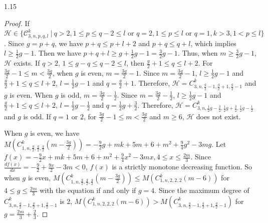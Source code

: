 \documentclass[preprint,12pt]{elsarticle1}
\numberwithin{equation}{section}
\begin{document}
\begin{spacing}{1.15}
\begin{proof}
If $\mathcal{H} \in \{\mathcal{C}_{3,n,p,q,l}^{k}~|~ q>2, 1\leq p\leq q-2\leq l\text{~or~} q=2,1\leq p\leq l  \text {~or~}q=1, k>3,1<p\leq l\}$.
Since $g=p+q$,
we have $p+q\leq p+l+2$ and $p+q\leq q+l$,
which implies $l\geq \frac{1}{2}g-1$.
Then we have $p+q+l\geq g+\frac{1}{2}g-1=\frac{3}{2}g-1$.
Thus,
when $m\geq \frac{3}{2}g-1$, $\mathcal{H}$ exists.
If $q>2$, $1\leq g-q\leq q-2\leq l$, then $\frac{g}{2}+1\leq q \leq l+2.$
For $\frac{3g}{2}-1\leq m<\frac{3g}{2}$, when $g$ is even, $m=\frac{3g}{2}-1$.
Since $m=\frac{3g}{2}-1$, $l\geq \frac{1}{2}g-1$ and $\frac{g}{2}+1\leq q \leq l+2$, $l=\frac{1}{2}g-1$ and $q=\frac{g}{2}+1$.
Therefore, $\mathcal{H}=C_{3,n,\frac{g}{2}-1,\frac{g}{2}+1,\frac{g}{2}-1}^{k}$ and $g$ is even.
When $g$ is odd, $m=\frac{3g}{2}-\frac{1}{2}$. Since $m=\frac{3g}{2}-\frac{1}{2}$, $l\geq \frac{1}{2}g-1$ and $\frac{g}{2}+1\leq q \leq l+2$, $l=\frac{1}{2}g-\frac{1}{2}$ and $q=\frac{1}{2}g+\frac{3}{2}$. Therefore, $\mathcal{H}=C_{3,n,\frac{1}{2}g-\frac{3}{2},\frac{1}{2}g+\frac{3}{2},\frac{1}{2}g-\frac{1}{2}}^{k}$ and $g$ is odd.
If $q=1$ or $2$, for $\frac{3g}{2}-1\leq m<\frac{3g}{2}$ and $m\geq 6$, $\mathcal{H}$ does not exist.





When $g$ is even, we have
$M(C_{1,n,\frac{g}{2},\frac{g}{2},\frac{g}{2}}^{k}(m-\frac{3g}{2}))=-\frac{9}{2}g+mk+5m+6+m^{2}+\frac{9}{4}g^{2}-3mg.$
Let $f(x)=-\frac{9}{2}x+mk+5m+6+m^{2}+\frac{9}{4}x^{2}-3mx, 4\leq x\leq \frac{2m}{3}.$ Since $\frac{df(x)}{dx}=-\frac{9}{2}+\frac{9x}{2}-3m<0$, $f(x)$ is a strictly monotone decreasing function. So when $g$ is even, $M(C_{1,n,\frac{g}{2},\frac{g}{2},\frac{g}{2}}^{k}(m-\frac{3g}{2}))\leq M(C_{1,n,2,2,2}^{k}(m-6))$ for $4\leq g\leq \frac{2m}{3}$ with the equation if and only if $g=4$. Since the maximum degree of $ C_{3,n,\frac{g}{2}-1,\frac{g}{2}+1,\frac{g}{2}-1}^{k}$ is 2, $M(C_{1,n,2,2,2}^{k}(m-6))> M(C_{3,n,\frac{g}{2}-1,\frac{g}{2}+1,\frac{g}{2}-1}^{k})$ for $g=\frac{2m}{3}+\frac{2}{3}.$ %


\end{proof}
\end{spacing}
\end{document}

